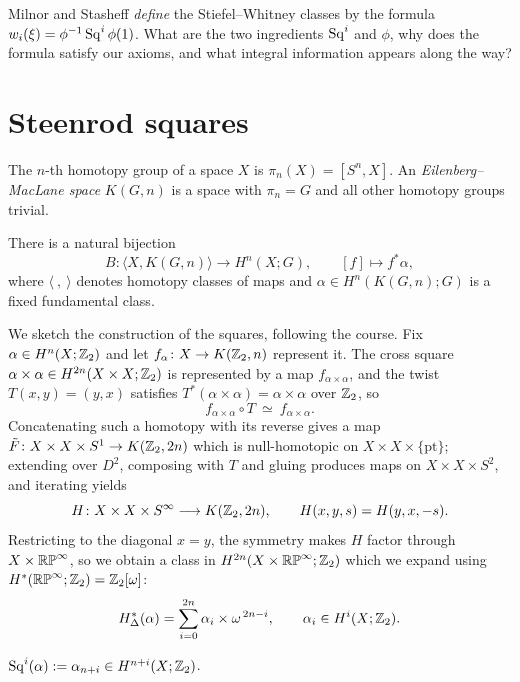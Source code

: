 \lecture

\begin{guiding}
Milnor and Stasheff \emph{define} the Stiefel--Whitney classes by the formula
$w_i(\xi)=\phi^{-1}\operatorname{Sq}^i\phi(1)$. What are the two ingredients $\operatorname{Sq}^i$ and
$\phi$, why does the formula satisfy our axioms, and what integral information
appears along the way?
\end{guiding}

\section{Steenrod squares}

\begin{definition}
The $n$-th homotopy group of a space $X$ is $\pi_n(X)=[S^n,X]$. An
\emph{Eilenberg--MacLane space} $K(G,n)$ is a space with $\pi_n=G$ and all other
homotopy groups trivial.
\end{definition}

\begin{theorem}
There is a natural bijection
\[
B\colon\langle X,K(G,n)\rangle\longrightarrow H^n(X;G),
\qquad
[f]\longmapsto f^*\alpha,
\]
where $\langle\ ,\ \rangle$ denotes homotopy classes of maps and
$\alpha\in H^n(K(G,n);G)$ is a fixed fundamental class.
\end{theorem}

We sketch the construction of the squares, following the course. Fix
$\alpha\in H^n(X;\mathbb{Z}_2)$ and let $f_\alpha\colon X\to K(\mathbb{Z}_2,n)$ represent it.
The cross square $\alpha\times\alpha\in H^{2n}(X\times X;\mathbb{Z}_2)$ is represented by
a map $f_{\alpha\times\alpha}$, and the twist $T(x,y)=(y,x)$ satisfies
$T^*(\alpha\times\alpha)=\alpha\times\alpha$ over $\mathbb{Z}_2$, so
\[
f_{\alpha\times\alpha}\circ T\ \simeq\ f_{\alpha\times\alpha}.
\]
Concatenating such a homotopy with its reverse gives a map
$\tilde F\colon X\times X\times S^1\to K(\mathbb{Z}_2,2n)$ which is null-homotopic on
$X\times X\times\{\mathrm{pt}\}$; extending over $D^2$, composing with $T$ and
gluing produces maps on $X\times X\times S^2$, and iterating yields
\[
H\colon X\times X\times S^\infty\longrightarrow K(\mathbb{Z}_2,2n),
\qquad
H(x,y,s)=H(y,x,-s).
\]
Restricting to the diagonal $x=y$, the symmetry makes $H$ factor through
$X\times\mathbb{RP}^\infty$, so we obtain a class in $H^{2n}(X\times\mathbb{RP}^\infty;\mathbb{Z}_2)$
which we expand using $H^*(\mathbb{RP}^\infty;\mathbb{Z}_2)=\mathbb{Z}_2[\omega]$:
\[
H_\Delta^*(\alpha)=\sum_{i=0}^{2n}\alpha_i\times\omega^{\,2n-i},
\qquad \alpha_i\in H^i(X;\mathbb{Z}_2).
\]

\begin{definition}
$\operatorname{Sq}^i(\alpha):=\alpha_{n+i}\in H^{n+i}(X;\mathbb{Z}_2)$.
\end{definition}

